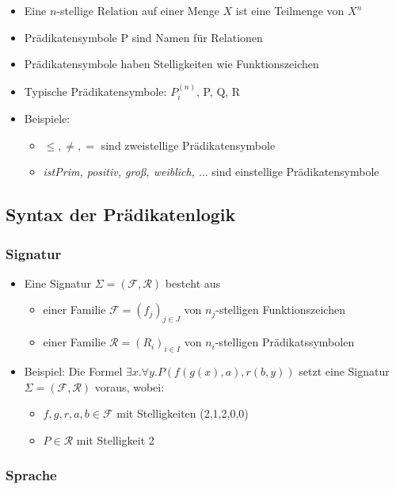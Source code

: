 \documentclass{scrartcl}
\begin{document}
\begin{itemize}
	\item Eine $n$-stellige Relation auf einer Menge $X$ ist eine Teilmenge von $X^n$
	\item Prädikatensymbole P sind Namen für Relationen
	\item Prädikatensymbole haben Stelligkeiten wie Funktionszeichen
	\item Typische Prädikatensymbole: $P_i^{(n)}$, P, Q, R
	\item Beispiele:
	\begin{itemize}
		\item $\leq, \neq, =$ sind zweistellige Prädikatensymbole
		\item \textit{istPrim, positiv, groß, weiblich, $\ldots$} sind einstellige Prädikatensymbole
	\end{itemize}
\end{itemize}

\subsection{Syntax der Prädikatenlogik}

\subsubsection{Signatur}

\begin{itemize}
	\item Eine Signatur $\Sigma = (\mathcal{F}, \mathcal{R})$ besteht aus
	\begin{itemize}
		\item einer Familie $\mathcal{F} = (f_j)_{j \in J}$ von $n_j$-stelligen Funktionszeichen
		\item einer Familie $\mathcal{R} = (R_i)_{i \in I}$ von $n_i$-stelligen Prädikatssymbolen
	\end{itemize}
	\item Beispiel: Die Formel $\exists x.\forall y.P(f(g(x), a), r(b,y))$ setzt eine Signatur $\Sigma = (\mathcal{F}, \mathcal{R})$ voraus, wobei:
	\begin{itemize}
		\item $f, g, r, a, b \in \mathcal{F}$ mit Stelligkeiten (2,1,2,0,0)
		\item $P \in \mathcal{R}$ mit Stelligkeit 2
	\end{itemize}
\end{itemize}

\subsubsection{Sprache}
\end{document}

